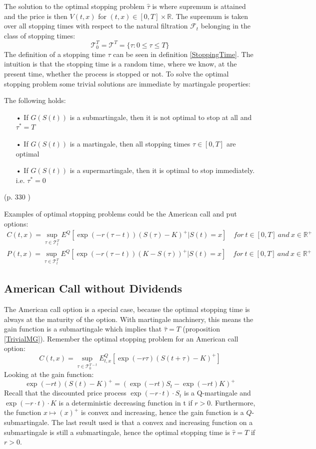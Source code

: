 The solution to the optimal stopping problem $\hat{\tau}$ is where supremum is attained and the price is then $V(t,x)$ for $(t,x)\in [0,T] \times \mathbb{R}$. The supremum is taken over all stopping times with respect to the natural filtration $\mathcal{F}_{t}$ belonging in the class of stopping times:
$$\mathcal{T}_0^T=\mathcal{T}^T=\{\tau : 0 \leq \tau \leq T \}$$
The definition of a stopping time $\tau$ can be seen in definition \ref{StoppingTime}. The intuition is that the stopping time is a random time, where we know, at the present time, whether the process is stopped or not. To solve the optimal stopping problem some trivial solutions are immediate by martingale properties:
\begin{proposition}\label{TrivialMG}
The following holds:
\begin{enumerate}
\item[•] If $G(S(t))$ is a submartingale, then it is not optimal to stop at all and $\tau^*=T$
\item[•] If $G(S(t))$ is a martingale, then all stopping times $\tau\in [0,T]$ are optimal
\item[•] If $G(S(t))$ is a supermartingale, then it is optimal to stop immediately. i.e. $\tau^*=0$
\end{enumerate}
\null \hfill(p. 330 \parencite{finKont})
\end{proposition}

Examples of optimal stopping problems could be the American call and put options:
\begin{align*}
C(t,x)=\sup_{\tau \in \mathcal{T}_t^T} E^Q[\exp(-r(\tau-t)) (S(\tau)-K)^+|S(t)=x] \quad for \ t\in [0,T] \ and \ x\in\mathbb{R}^+\\
P(t,x)=\sup_{\tau \in \mathcal{T}_t^T} E^Q[\exp(-r(\tau-t)) (K-S(\tau))^+|S(t)=x] \quad for \ t\in [0,T] \ and \ x\in\mathbb{R}^+
\end{align*}


\subsection{American Call without Dividends}\label{AmericanCall}
The American call option is a special case, because the optimal stopping time is always at the maturity of the option. With martingale machinery, this means the gain function is a submartingale which implies that $\hat{\tau}=T$ (proposition \ref{TrivialMG}). Remember the optimal stopping problem for an American call option:
$$C(t,x)=\sup_{\tau \in \mathcal{T}_0^{T-t}} E_{t,x}^Q[\exp(-r\tau) (S(t+\tau)-K)^+]$$
Looking at the gain function:
\begin{equation*}
\exp(-r t) (S(t)-K)^+ = (\exp(-r t) S_{t} - \exp(-r t) K)^+
\end{equation*}
Recall that the discounted price process $\exp(-r\cdot t) \cdot S_t$ is a Q-martingale and $\exp(-r\cdot t) \cdot K$ is a deterministic decreasing function in t if $r>0$. Furthermore, the function $x \mapsto (x)^+$ is convex and increasing, hence the gain function is a $Q$-submartingale. The last result used is that a convex and increasing function on a submartingale is still a submartingale, hence the optimal stopping time is $\hat{\tau}=T$ if $r>0$.

